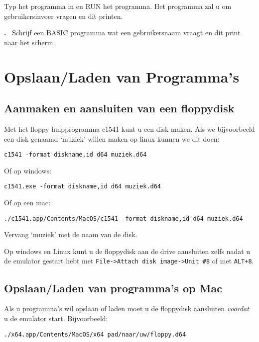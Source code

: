 \documentclass{article}
\newcounter{problem}
\newcounter{solution}
\newcommand\problem{%
  \stepcounter{problem}%
  \textbf{\theproblem.}~%
  \setcounter{solution}{0}%
}
\begin{document}
Typ het programma in en RUN het programma.
Het programma zal u om gebruikersinvoer vragen en dit printen.

\problem Schrijf een BASIC programma wat een gebruikersnaam vraagt en dit print naar het scherm.

\section{Opslaan/Laden van Programma's}

\subsection{Aanmaken en aansluiten van een floppydisk}

Met het floppy hulpprogramma c1541 kunt u een disk maken.
Als we bijvoorbeeld een disk genaamd `muziek' willen maken op linux kunnen we dit doen:

\begin{lstlisting}
c1541 -format diskname,id d64 muziek.d64
\end{lstlisting}

Of op windows:

\begin{lstlisting}
c1541.exe -format diskname,id d64 muziek.d64
\end{lstlisting}

Of op een mac:

\begin{lstlisting}
./c1541.app/Contents/MacOS/c1541 -format diskname,id d64 muziek.d64
\end{lstlisting}

Vervang `muziek' met de naam van de disk.

Op windows en Linux kunt u de floppydisk aan de drive aansluiten zelfs nadat u de emulator gestart hebt met \verb:File->Attach disk image->Unit #8: of met \verb:ALT+8:.

\subsection{Opslaan/Laden van programma's op Mac}

Als u programma's wil opslaan of laden moet u de floppydisk aansluiten \emph{voordat} u de emulator start. Bijvoorbeeld:

\begin{lstlisting}
./x64.app/Contents/MacOS/x64 pad/naar/uw/floppy.d64
\end{lstlisting}
\end{document}
